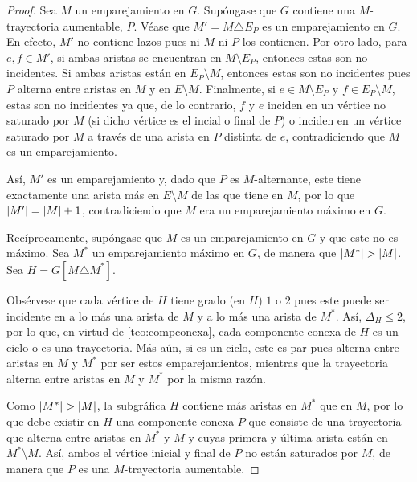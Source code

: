 \begin{proof}
  Sea $M$ un emparejamiento en $G$. Sup\'ongase que $G$ contiene una
  $M$-trayectoria aumentable, $P$. V\'ease que $M'=M\triangle E_P$ es un
  emparejamiento en $G$. En efecto, $M'$ no contiene lazos pues ni $M$ ni $P$
  los contienen. Por otro lado, para $e,f\in M'$, si ambas aristas se encuentran
  en $M\setminus E_P$, entonces estas son no incidentes. Si ambas aristas
  est\'an en $E_P\setminus M$, entonces estas son no incidentes pues $P$ alterna
  entre aristas en $M$ y en $E\setminus M$. Finalmente, si $e\in M\setminus E_P$
  y $f\in E_P\setminus M$, estas son no incidentes ya que, de lo contrario, $f$
  y $e$ inciden en un v\'ertice no saturado por $M$ (si dicho v\'ertice es el
  incial o final de $P$) o inciden en un v\'ertice saturado por $M$ a trav\'es
  de una arista en $P$ distinta de $e$, contradiciendo que $M$ es un
  emparejamiento.
  
  As\'i, $M'$ es un emparejamiento y, dado que $P$ es $M$-alternante, este tiene
  exactamente una arista m\'as en $E\setminus M$ de las que tiene en $M$, por lo
  que $\left|M'\right| = \left|M\right| + 1$, contradiciendo que $M$ era un emparejamiento
  m\'aximo en $G$.

  Rec\'iprocamente, sup\'ongase que $M$ es un emparejamiento en $G$ y que este
  no es m\'aximo. Sea $M^*$ un emparejamiento m\'aximo en $G$, de manera que
  $\left|M^*\right| > \left|M\right|$. Sea $H=G[M\triangle M^*]$.

  Obs\'ervese que cada v\'ertice de $H$ tiene grado (en $H$) $1$ o $2$ pues este
  puede ser incidente en a lo m\'as una arista de $M$ y a lo m\'as una arista de
  $M^*$. As\'i, $\Delta_H\leq 2$, por lo que, en virtud de
  \cref{teo:compconexa}, cada componente conexa de $H$ es un ciclo o es una
  trayectoria. M\'as a\'un, si es un ciclo, este es par pues alterna entre
  aristas en $M$ y $M^*$ por ser estos emparejamientos, mientras que la
  trayectoria alterna entre aristas en $M$ y $M^*$ por la misma raz\'on.

  Como $\abs{M^*}>\abs{M}$, la subgr\'afica $H$ contiene m\'as aristas en $M^*$
  que en $M$, por lo que debe existir en $H$ una componente conexa $P$ que
  consiste de una trayectoria que alterna entre aristas en $M^*$ y $M$ y cuyas
  primera y \'ultima arista est\'an en $M^*\setminus M$. As\'i, ambos el
  v\'ertice inicial y final de $P$ no est\'an saturados por $M$, de manera que
  $P$ es una $M$-trayectoria aumentable.

\end{proof}

